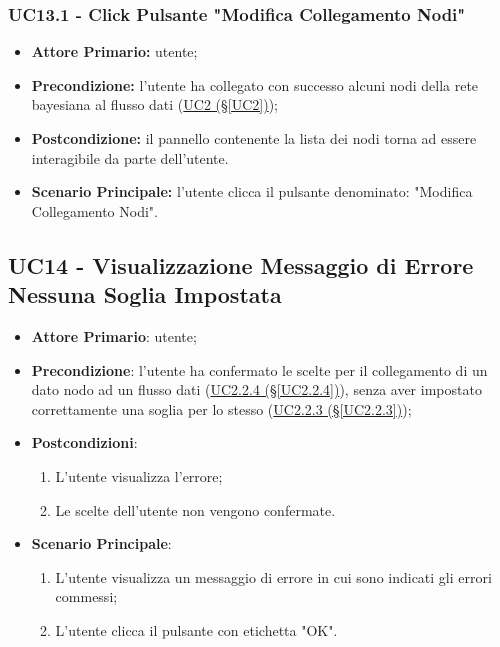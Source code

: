 \subsubsection{UC13.1 - Click Pulsante "Modifica Collegamento Nodi"}\label{UC13.1}
\begin{itemize}
\item \textbf{Attore Primario:} utente;
\item \textbf{Precondizione:} l'utente ha collegato con successo alcuni nodi della rete bayesiana al flusso dati 			(\hyperref[UC2]{UC2 (§\ref*{UC2})});
\item \textbf{Postcondizione:} il pannello contenente la lista dei nodi torna ad essere interagibile da parte dell'utente.
\item \textbf{Scenario Principale:} l'utente clicca il pulsante denominato: "Modifica Collegamento Nodi".
\end{itemize}
\newpage

\subsection{UC14 - Visualizzazione Messaggio di Errore Nessuna Soglia Impostata}\label{UC14}
\begin{itemize}
\item \textbf{Attore Primario}: utente;
\item \textbf{Precondizione}: l'utente ha confermato le scelte per il collegamento di un dato nodo ad un flusso 				dati (\hyperref[UC2.2.4]{UC2.2.4 (§\ref*{UC2.2.4})}), senza aver impostato correttamente una soglia per lo stesso 	(\hyperref[UC2.2.3]{UC2.2.3 (§\ref*{UC2.2.3})});
\item \textbf{Postcondizioni}: 
	\begin{enumerate}
	\item L'utente visualizza l'errore;
	\item Le scelte dell'utente non vengono confermate.
	\end{enumerate}
\item \textbf{Scenario Principale}: 
	\begin{enumerate}
	\item L'utente visualizza un messaggio di errore in cui sono indicati gli errori commessi;
	\item L'utente clicca il pulsante con etichetta "OK".
	\end{enumerate}
\end{itemize}

\pagebreak

